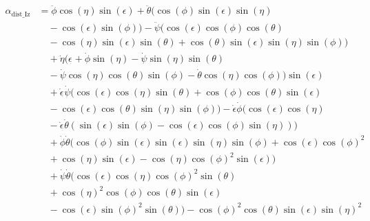 \documentclass[letterpaper, 10 pt, conference]{ieeeconf}  %
\begin{document}
\begin{equation}
  \begin{aligned}
    \alpha_{\text{dist\_Iz}} & = \ddot{\phi}\cos(\eta)\sin(\epsilon) + \ddot{\theta}(\cos(\phi)\sin(\epsilon)\sin(\eta)                                \\
                             & \quad  - \cos(\epsilon)\sin(\phi)) - \ddot{\psi}(\cos(\epsilon)\cos(\phi)\cos(\theta)                                   \\
                             & \quad - \cos(\eta)\sin(\epsilon)\sin(\theta) + \cos(\theta)\sin(\epsilon)\sin(\eta)\sin(\phi))                          \\
                             & \quad + \dot{\eta}(\epsilon_{\dot{}} + \dot{\phi}\sin(\eta) - \dot{\psi}\sin(\eta)\sin(\theta)                          \\
                             & \quad - \dot{\psi}\cos(\eta)\cos(\theta)\sin(\phi) - \dot{\theta}\cos(\eta)\cos(\phi))\sin(\epsilon)                    \\
                             & \quad  + \dot\epsilon_{\dot{}}\dot{\psi}(\cos(\epsilon)\cos(\eta)\sin(\theta) + \cos(\phi)\cos(\theta)\sin(\epsilon)    \\
                             & \quad - \cos(\epsilon)\cos(\theta)\sin(\eta)\sin(\phi)) - \dot\epsilon\dot{\phi}(\cos(\epsilon)\cos(\eta)               \\
                             & \quad - \dot\epsilon_{\dot{}}\dot{\theta}(\sin(\epsilon)\sin(\phi) - \cos(\epsilon)\cos(\phi)\sin(\eta)))               \\
                             & \quad  + \dot{\phi}\dot{\theta}(\cos(\phi)\sin(\epsilon)\sin(\epsilon)\sin(\eta)\sin(\phi) + \cos(\epsilon)\cos(\phi)^2 \\
                             & \quad + \cos(\eta)\sin(\epsilon) - \cos(\eta)\cos(\phi)^2\sin(\epsilon))                                                \\
                             & \quad  + \dot{\psi}\dot{\theta}(\cos(\epsilon)\cos(\eta)\cos(\phi)^2\sin(\theta)                                        \\
                             & \quad  + \cos(\eta)^2\cos(\phi)\cos(\theta)\sin(\epsilon)                                                               \\
                             & \quad - \cos(\epsilon)\sin(\phi)^2\sin(\theta)) - \cos(\phi)^2\cos(\theta)\sin(\epsilon)\sin(\eta)^2                    \\

\end{aligned}
\end{equation}
\end{document}
